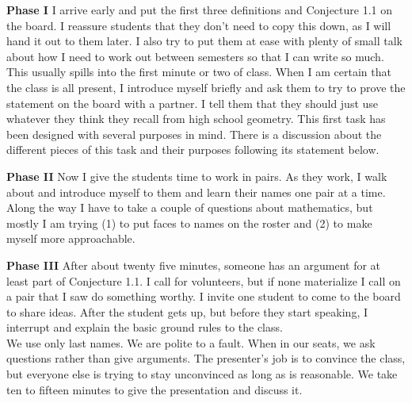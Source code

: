 \documentclass{tufte-handout}
\theoremstyle{definition}
\begin{document}
\begin{compactdesc}
\item[\textbf{Phase I}] I arrive early and put the first three definitions and Conjecture 1.1 on the board.
I reassure students that they don't need to copy this down, as I will hand it out to them later.
I also try to put them at ease with plenty of small talk about how I need to work out between semesters so that I can write so much.
This usually spills into the first minute or two of class.
When I am certain that the class is all present, I introduce myself briefly and ask them to try to prove the statement on the board with a partner. 
I tell them that they should just use whatever they think they recall from high school geometry.
This first task has been designed with several purposes in mind. There is a discussion about the different pieces of this task and their purposes following its statement below.\\[.1in]

\item[\textbf{Phase II}] Now I give the students time to work in pairs.
As they work, I walk about and introduce myself to them and learn their names one pair at a time.
Along the way I have to take a couple of questions about mathematics, but mostly I am trying (1) to put faces to names on the roster and (2) to make myself more approachable.\\[.1in]

\item[\textbf{Phase III}] After about twenty five minutes, someone has an argument for at least part of Conjecture 1.1.
I call for volunteers, but if none materialize I call on a pair that I saw do something worthy.
I invite one student to come to the board to share ideas.
After the student gets up, but before they start speaking, I interrupt and explain the basic ground rules to the class.\\[.1in]

We use only last names.
We are polite to a fault.
When in our seats, we ask questions rather than give arguments.
The presenter's job is to convince the class, but everyone else is trying to stay unconvinced as long as is reasonable.
We take ten to fifteen minutes to give the presentation and discuss it.\\[.1in]


\end{compactdesc}
\end{document}
